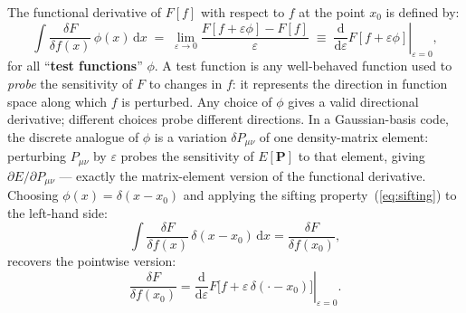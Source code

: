 \documentclass[12pt,letterpaper]{article}
\newcommand{\dd}{\mathrm{d}}
\theoremstyle{definition}
\begin{document}
\begin{keyresult}[title={Definition: Functional Derivative}]
The functional derivative of $F[f]$ with respect to $f$ at the point
$x_0$ is defined by:
\begin{equation}
  \int \frac{\delta F}{\delta f(x)}\,\phi(x)\,\dd x
  \;=\;
  \lim_{\varepsilon\to 0}
  \frac{F[f + \varepsilon\phi] - F[f]}{\varepsilon}
  \;\equiv\;
  \left.\frac{\dd}{\dd\varepsilon}F[f+\varepsilon\phi]\right|_{\varepsilon=0},
  \label{eq:fd_def}
\end{equation}
for all ``\textbf{test functions}'' $\phi$.
A test function is any well-behaved function used to \emph{probe} the
sensitivity of $F$ to changes in $f$: it represents the direction in
function space along which $f$ is perturbed.
Any choice of $\phi$ gives a valid directional derivative; different
choices probe different directions.
In a Gaussian-basis code, the discrete analogue of $\phi$ is a variation
$\delta P_{\mu\nu}$ of one density-matrix element: perturbing $P_{\mu\nu}$
by $\varepsilon$ probes the sensitivity of $E[\bm{P}]$ to that element,
giving $\partial E/\partial P_{\mu\nu}$ --- exactly the matrix-element
version of the functional derivative.
Choosing $\phi(x) = \delta(x-x_0)$
and applying the sifting property~(\ref{eq:sifting}) to the left-hand side:
\begin{equation}
  \int \frac{\delta F}{\delta f(x)}\,\delta(x-x_0)\,\dd x
  = \frac{\delta F}{\delta f(x_0)},
\end{equation}
recovers the pointwise version:
\begin{equation}
  \frac{\delta F}{\delta f(x_0)}
  = \left.\frac{\dd}{\dd\varepsilon}F\bigl[f+\varepsilon\,\delta(\cdot-x_0)\bigr]
    \right|_{\varepsilon=0}.
  \label{eq:fd_pointwise}
\end{equation}
\end{keyresult}
\end{document}
